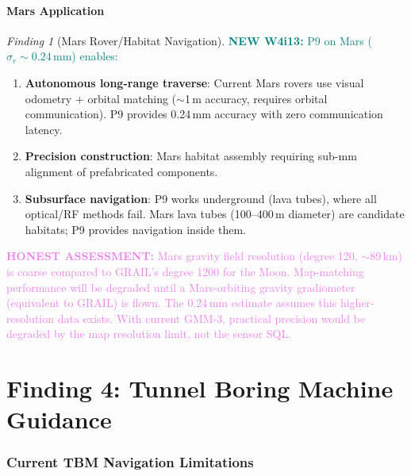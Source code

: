 \documentclass[11pt]{article}
\theoremstyle{definition}
\theoremstyle{remark}
\newtheorem{finding}[theorem]{Finding}
\newcommand{\honest}[1]{\textcolor{violet}{\textbf{HONEST ASSESSMENT:} #1}}
\newcommand{\newfinding}[1]{\textcolor{teal}{\textbf{NEW W4i13:} #1}}
\begin{document}
\subsection{Mars Application}

\begin{finding}[Mars Rover/Habitat Navigation]
\label{find:mars-nav}
\newfinding{P9 on Mars ($\sigma_r \sim 0.24$\,mm) enables:}
\begin{enumerate}[nosep]
\item \textbf{Autonomous long-range traverse}: Current Mars rovers use
  visual odometry + orbital matching ($\sim$1\,m accuracy, requires
  orbital communication). P9 provides 0.24\,mm accuracy with zero
  communication latency.
\item \textbf{Precision construction}: Mars habitat assembly requiring
  sub-mm alignment of prefabricated components.
\item \textbf{Subsurface navigation}: P9 works underground (lava tubes),
  where all optical/RF methods fail. Mars lava tubes (100--400\,m diameter)
  are candidate habitats; P9 provides navigation inside them.
\end{enumerate}
\end{finding}

\honest{Mars gravity field resolution (degree 120, $\sim$89\,km) is
coarse compared to GRAIL's degree 1200 for the Moon. Map-matching
performance will be degraded until a Mars-orbiting gravity gradiometer
(equivalent to GRAIL) is flown. The 0.24\,mm estimate assumes this
higher-resolution data exists. With current GMM-3, practical
precision would be degraded by the map resolution limit, not
the sensor SQL.}

\part{Finding 4: Tunnel Boring Machine Guidance}
\label{part:tbm}

\section{Current TBM Navigation Limitations}
\label{sec:tbm-current}
\end{document}
